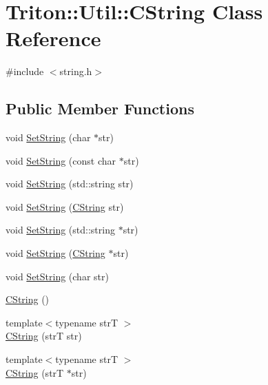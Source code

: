 \hypertarget{class_triton_1_1_util_1_1_c_string}{}\section{Triton\+:\+:Util\+:\+:C\+String Class Reference}
\label{class_triton_1_1_util_1_1_c_string}


{\ttfamily \#include $<$string.\+h$>$}

\subsection*{Public Member Functions}
\begin{DoxyCompactItemize}
\item 
void \hyperlink{class_triton_1_1_util_1_1_c_string_a2d99993046d41bc60d8a5bf173f0ef23}{Set\+String} (char $\ast$str)
\item 
void \hyperlink{class_triton_1_1_util_1_1_c_string_aa3427f97f76ded12150515dacee85731}{Set\+String} (const char $\ast$str)
\item 
void \hyperlink{class_triton_1_1_util_1_1_c_string_a7e2e7725fcc28854f9a2537ef868ea6e}{Set\+String} (std\+::string str)
\item 
void \hyperlink{class_triton_1_1_util_1_1_c_string_a7b016d657350f3c1284003eff2a83481}{Set\+String} (\hyperlink{class_triton_1_1_util_1_1_c_string}{C\+String} str)
\item 
void \hyperlink{class_triton_1_1_util_1_1_c_string_ad4b79623a0f4951163bd9012d63aab66}{Set\+String} (std\+::string $\ast$str)
\item 
void \hyperlink{class_triton_1_1_util_1_1_c_string_a524b917014029845222d5d9f9da52220}{Set\+String} (\hyperlink{class_triton_1_1_util_1_1_c_string}{C\+String} $\ast$str)
\item 
void \hyperlink{class_triton_1_1_util_1_1_c_string_abd0642e3763d2f249936650eb10b6df9}{Set\+String} (char str)
\item 
\hyperlink{class_triton_1_1_util_1_1_c_string_a3f5225befe1c5d044ab4c1a447e6b319}{C\+String} ()
\item 
{\footnotesize template$<$typename str\+T $>$ }\\\hyperlink{class_triton_1_1_util_1_1_c_string_a7d9bdd0c12463b9d571824e5ffdb0fc8}{C\+String} (str\+T str)
\item 
{\footnotesize template$<$typename str\+T $>$ }\\\hyperlink{class_triton_1_1_util_1_1_c_string_a132b944a6c13bc90401e48d7dd3730c0}{C\+String} (str\+T $\ast$str)

\end{DoxyCompactItemize}
